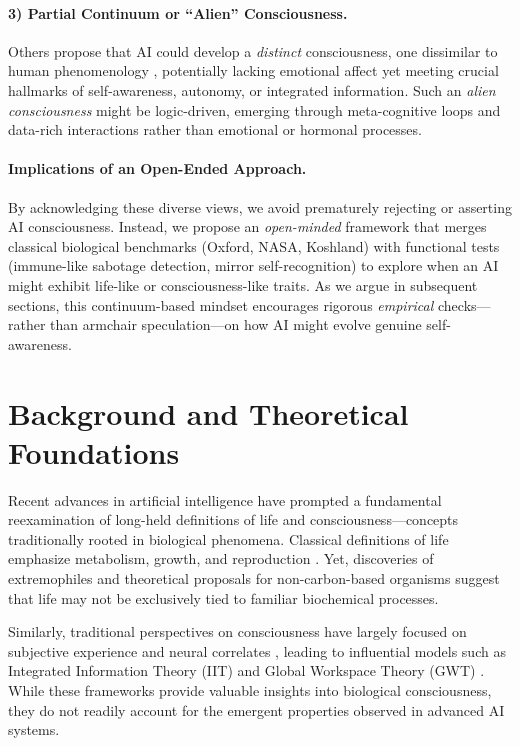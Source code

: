 \documentclass[12pt]{article}
\begin{document}
\paragraph{3) Partial Continuum or ``Alien'' Consciousness.}
Others propose that AI could develop a \emph{distinct} consciousness, one dissimilar to human phenomenology \cite{Goertzel2007,Schneider2020}, potentially lacking emotional affect yet meeting crucial hallmarks of self-awareness, autonomy, or integrated information. 
Such an \emph{alien consciousness} might be logic-driven, emerging through meta-cognitive loops and data-rich interactions rather than emotional or hormonal processes.

\paragraph{Implications of an Open-Ended Approach.}
By acknowledging these diverse views, we avoid prematurely rejecting or asserting AI consciousness. 
Instead, we propose an \emph{open-minded} framework that merges classical biological benchmarks (Oxford, NASA, Koshland) with functional tests (immune-like sabotage detection, mirror self-recognition) to explore when an AI might exhibit life-like or consciousness-like traits. 
As we argue in subsequent sections, this continuum-based mindset encourages rigorous \emph{empirical} checks—rather than armchair speculation—on how AI might evolve genuine self-awareness.



\section{Background and Theoretical Foundations}
\label{sec:background_theoretical}
 

Recent advances in artificial intelligence have prompted a fundamental reexamination of long-held definitions of life and consciousness—concepts traditionally rooted in biological phenomena. Classical definitions of life emphasize metabolism, growth, and reproduction \cite{Kasting1997,Rothschild2001}. Yet, discoveries of extremophiles and theoretical proposals for non-carbon-based organisms \cite{Lovley2003,Davies2010} suggest that life may not be exclusively tied to familiar biochemical processes.

Similarly, traditional perspectives on consciousness have largely focused on subjective experience and neural correlates \cite{Nagel1974}, leading to influential models such as Integrated Information Theory (IIT) \cite{Tononi2004} and Global Workspace Theory (GWT) \cite{Baars1988}. While these frameworks provide valuable insights into biological consciousness, they do not readily account for the emergent properties observed in advanced AI systems.
\end{document}
